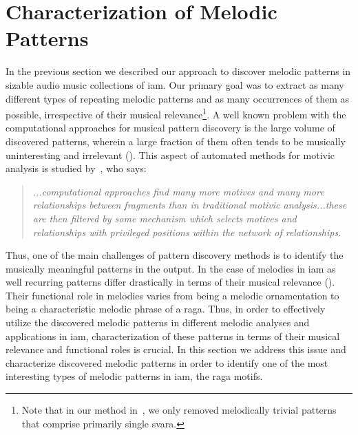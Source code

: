 

\section{Characterization of Melodic Patterns}
\label{sec:patterns_characterization_of_melodic_patterns}

In the previous section we described our approach to discover melodic patterns in sizable audio music collections of \gls{iam}. Our primary goal was to extract as many different types of repeating melodic patterns and as many occurrences of them as possible, irrespective of their musical relevance\footnote{Note that in our method in~, we only removed melodically trivial patterns that comprise primarily single \gls{svara}.}. A well known problem with the computational approaches for musical pattern discovery is the large volume of discovered patterns, wherein a large fraction of them often tends to be musically uninteresting and irrelevant (). This aspect of automated methods for motivic analysis is studied by~\cite{marsden2012counselling}, who says:

\blockquote{\textit{...computational approaches find many more motives and many more relationships between fragments than in traditional motivic analysis...these are then filtered by some mechanism which selects motives and relationships with privileged positions within the network of relationships.}}

Thus, one of the main challenges of pattern discovery methods is to identify the musically meaningful patterns in the output. In the case of melodies in \gls{iam} as well recurring patterns differ drastically in terms of their musical relevance (). Their functional role in melodies varies from being a melodic ornamentation to being a characteristic melodic phrase of a \gls{raga}. Thus, in order to effectively utilize the discovered melodic patterns in different melodic analyses and applications in \gls{iam}, characterization of these patterns in terms of their musical relevance and functional roles is crucial. In this section we address this issue and characterize discovered melodic patterns in order to identify one of the most interesting types of melodic patterns in \gls{iam}, the \gls{raga} motifs.
 
